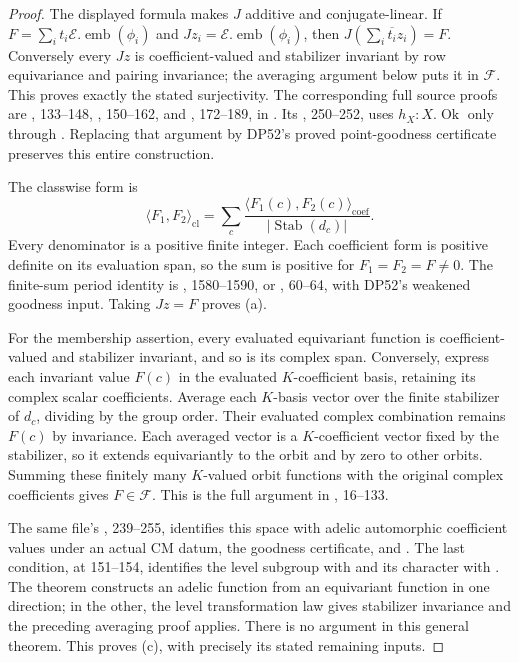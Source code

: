\begin{proof}
The displayed formula makes $J$ additive and conjugate-linear.
If $F=\sum_i t_i\mathcal E.\operatorname{emb}(\phi_i)$ and
$Jz_i=\mathcal E.\operatorname{emb}(\phi_i)$, then
$J(\sum_i\overline{t_i}z_i)=F$.
Conversely every $Jz$ is coefficient-valued and stabilizer invariant by
row equivariance and pairing invariance; the averaging argument below
puts it in $\mathcal F$.
This proves exactly the stated surjectivity.
The corresponding full source proofs are
, 133--148,
, 150--162, and , 172--189,
in .
Its , 250--252, uses
$h_X:X.\operatorname{Ok}$ only through .
Replacing that argument by DP52's proved point-goodness certificate
preserves this entire construction.

The classwise form is
\[
 \langle F_1,F_2\rangle_{\mathrm{cl}}
 =\sum_c\frac{\langle F_1(c),F_2(c)\rangle_{\mathrm{coef}}}
                {|\operatorname{Stab}(d_c)|}.
\]
Every denominator is a positive finite integer.
Each coefficient form is positive definite on its evaluation span,
so the sum is positive for $F_1=F_2=F\ne0$.
The finite-sum period identity is
, 1580--1590, or
, 60--64, with DP52's weakened
goodness input.
Taking $Jz=F$ proves (a).

For the membership assertion, every evaluated equivariant function is
coefficient-valued and stabilizer invariant, and so is its complex span.
Conversely, express each invariant value $F(c)$ in the evaluated
$K$-coefficient basis, retaining its complex scalar coefficients.
Average each $K$-basis vector over the finite stabilizer of $d_c$,
dividing by the group order.
Their evaluated complex combination remains $F(c)$ by invariance.
Each averaged vector is a $K$-coefficient vector fixed by the stabilizer,
so it extends equivariantly to the orbit and by zero to other orbits.
Summing these finitely many $K$-valued orbit functions with the original
complex coefficients gives $F\in\mathcal F$.
This is the full argument in , 16--133.

The same file's , 239--255, identifies this space with
adelic automorphic coefficient values under an actual CM datum,
the goodness certificate,  and .
The last condition, at 151--154, identifies the level subgroup with
 and its character with .
The theorem constructs an adelic function from an equivariant function
in one direction; in the other, the level transformation law gives
stabilizer invariance and the preceding averaging proof applies.
There is no  argument in this general theorem.
This proves (c), with precisely its stated remaining inputs.


\end{proof}
